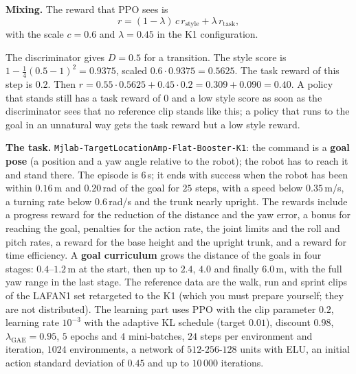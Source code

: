 \textbf{Mixing.} The reward that PPO sees is
\[
r=(1-\lambda)\,c\,r_{\text{style}}+\lambda\,r_{\text{task}},
\]
with the scale $c=0.6$ and $\lambda=0.45$ in the K1 configuration.

\begin{example}
The discriminator gives $D=0.5$ for a transition. The style score is $1-\tfrac14(0.5-1)^2=0.9375$, scaled $0.6\cdot0.9375=0.5625$. The task reward of this step is $0.2$. Then $r=0.55\cdot0.5625+0.45\cdot0.2=0.309+0.090=0.40$. A policy that stands still has a task reward of $0$ and a low style score as soon as the discriminator sees that no reference clip stands like this; a policy that runs to the goal in an unnatural way gets the task reward but a low style reward.
\end{example}

\textbf{The task.} \verb!Mjlab-TargetLocationAmp-Flat-Booster-K1!: the command is a \textbf{goal pose} (a position and a yaw angle relative to the robot); the robot has to reach it and stand there. The episode is $6$\,s; it ends with success when the robot has been within $0.16$\,m and $0.20$\,rad of the goal for $25$ steps, with a speed below $0.35$\,m/s, a turning rate below $0.6$\,rad/s and the trunk nearly upright. The rewards include a progress reward for the reduction of the distance and the yaw error, a bonus for reaching the goal, penalties for the action rate, the joint limits and the roll and pitch rates, a reward for the base height and the upright trunk, and a reward for time efficiency. A \textbf{goal curriculum} grows the distance of the goals in four stages: $0.4$--$1.2$\,m at the start, then up to $2.4$, $4.0$ and finally $6.0$\,m, with the full yaw range in the last stage. The reference data are the walk, run and sprint clips of the LAFAN1 set retargeted to the K1 (which you must prepare yourself; they are not distributed). The learning part uses PPO with the clip parameter $0.2$, learning rate $10^{-3}$ with the adaptive KL schedule (target $0.01$), discount $0.98$, $\lambda_{\text{GAE}}=0.95$, $5$ epochs and $4$ mini-batches, $24$ steps per environment and iteration, $1024$ environments, a network of $512$-$256$-$128$ units with ELU, an initial action standard deviation of $0.45$ and up to $10\,000$ iterations.

